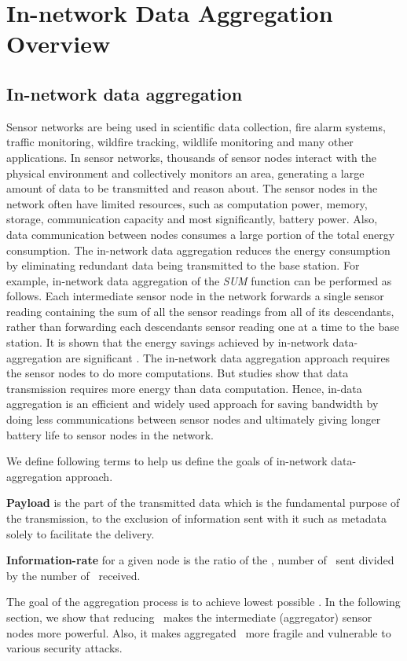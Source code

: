 \chapter{In-network Data Aggregation Overview} %
\label{cha:In-network Data-Aggregation Overview}

\section{In-network data aggregation}
	Sensor networks are being used in scientific data collection, fire alarm systems, traffic monitoring, wildfire tracking, wildlife monitoring and many other applications.
	In sensor networks, thousands of sensor nodes interact with the physical environment and collectively monitors an area, generating a large amount of data to be transmitted and reason about.
	The sensor nodes in the network often have limited resources, such as computation power, memory, storage, communication capacity and most significantly, battery power.
	Also, data communication between nodes consumes a large portion of the total energy consumption. 
	The in-network data aggregation reduces the energy consumption by eliminating redundant data being transmitted to the base station.
	For example, in-network data aggregation of the \textit{SUM} function can be performed as follows. 
	Each intermediate sensor node in the network forwards a single sensor reading containing the sum of all the sensor readings from all of its descendants, rather than forwarding each descendants sensor reading one at a time to the base station.
	It is shown that the energy savings achieved by in-network data-aggregation are significant \cite{madden2002tag}.
	The in-network data aggregation approach requires the sensor nodes to do more computations.
	But studies show that data transmission requires more energy than data computation. 
	Hence, in-data aggregation is an efficient and widely used approach for saving bandwidth by doing less communications between sensor nodes and ultimately giving longer battery life to sensor nodes in the network.

	We define following terms to help us define the goals of in-network data-aggregation approach.
	\begin{definition}\label{def:payload}
		\textbf{Payload} is the part of the transmitted data which is the fundamental purpose of the transmission, to the exclusion of information sent with it such as metadata solely to facilitate the delivery.
	\end{definition}
	\begin{definition}\label{def:information-rate}
		\textbf{Information-rate} for a given node is the ratio of the \payloads, number of \payloads\ sent divided by the number of \payloads\ received.
	\end{definition}
	The goal of the aggregation process is to achieve lowest possible \informationRate.
	In the following section, we show that reducing \informationRate\ makes the intermediate (aggregator) sensor nodes more powerful. Also, it makes aggregated \payload\ more fragile and vulnerable to various security attacks.

